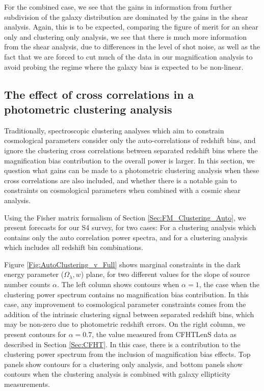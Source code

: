 \documentclass[useAMS,usenatbib,times,letter,amssymb]{mn2e}
\begin{document}
For the combined case, we see that the gains in information from further subdivision of the galaxy distribution are dominated by the gains in the shear analysis. Again, this is to be expected, comparing the figure of merit for an shear only and clustering only analysis, we see that there is much more information from the shear analysis, due to differences in the level of shot noise, as well as the fact that we are forced to cut much of the data in our magnification analysis to avoid probing the regime where the galaxy bias is expected to be non-linear.


\subsection{The effect of cross correlations in a photometric clustering analysis}\label{Sec:AutoClustering_v_Full}
Traditionally, spectroscopic clustering analyses which aim to constrain cosmological parameters consider only the auto-correlations of redshift bins, and ignore the clustering cross correlations between separated redshift bins where the magnification bias contribution to the overall power is larger. In this section, we question what gains can be made to a photometric clustering analysis when these cross correlations are also included, and whether there is a notable gain to constraints on cosmological parameters when  combined with a cosmic shear analysis.

Using the Fisher matrix formalism of Section \ref{Sec:FM_Clustering_Auto}, we present forecasts for our S4 survey, for two cases: For a clustering analysis which contains only the auto correlation power spectra, and for a clustering analysis which includes all redshift bin combinations.

Figure \ref{Fig:AutoClustering_v_Full} shows marginal constraints in the dark energy parameter ($\Omega_\lambda, w$) plane, for two different values for the slope of source number counts $\alpha$. The left column shows contours when $\alpha = 1$, the case when the clustering power spectrum contains no magnification bias contribution. In this case, any improvement to cosmological parameter constraints comes from the addition of the intrinsic clustering signal between separated redshift bins, which may be non-zero due to photometric redshift errors. On the right column, we present contours for $\alpha = 0.7$, the value measured from CFHTLenS data as described in Section \ref{Sec:CFHT}. In this case, there is a contribution to the clustering power spectrum from the inclusion of magnification bias effects. Top panels show contours for a clustering only analysis, and bottom panels show contours when the clustering analysis is combined with galaxy ellipticity measurements.
\end{document}
